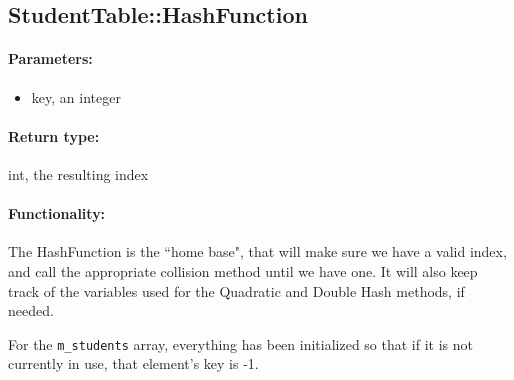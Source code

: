 \documentclass[a4paper,12pt,oneside]{book}
\begin{document}
\hrulefill

\subsection{StudentTable::HashFunction}

\paragraph{Parameters:}

\begin{itemize}
    \item   key, an integer
\end{itemize}

\paragraph{Return type:} int, the resulting index

\paragraph{Functionality:}

The HashFunction is the ``home base", that will make sure we have a valid
index, and call the appropriate collision method until we have one.
It will also keep track of the variables used for the Quadratic and Double Hash methods,
if needed.

For the \texttt{m\_students} array, everything has been initialized so that
if it is not currently in use, that element's key is -1.
\end{document}
